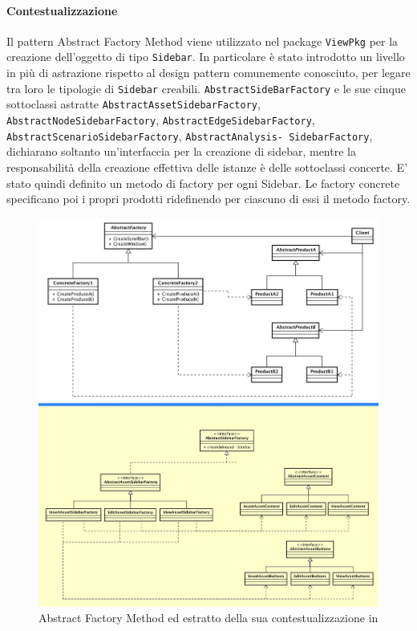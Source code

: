 \paragraph{Contestualizzazione}
Il pattern Abstract Factory Method viene utilizzato nel package \texttt{ViewPkg} per la creazione dell'oggetto di tipo \texttt{Sidebar}.
In particolare è stato introdotto un livello in più di astrazione rispetto al design pattern comunemente conosciuto, per legare tra loro le tipologie di \texttt{Sidebar} creabili.
\texttt{AbstractSideBarFactory} e le sue cinque sottoclassi astratte \texttt{AbstractAssetSidebarFactory}, \texttt{AbstractNodeSidebarFactory}, \texttt{AbstractEdgeSidebarFactory}, \texttt{AbstractScenarioSidebarFactory}, \texttt{AbstractAnalysis- SidebarFactory}, dichiarano soltanto un'interfaccia per la creazione di sidebar, mentre la responsabilità della creazione effettiva delle istanze è delle sottoclassi concerte. E' stato quindi definito un metodo di factory per ogni Sidebar. Le factory concrete specificano poi i propri prodotti ridefinendo per ciascuno di essi il metodo factory.
	\begin{figure}[H]
		\label{builder_compara}
		\centering
		\includegraphics[width=\textwidth]{img/absComparati.png}
		\caption{Abstract Factory Method ed estratto della sua contestualizzazione in \progetto}
	\end{figure}
	
